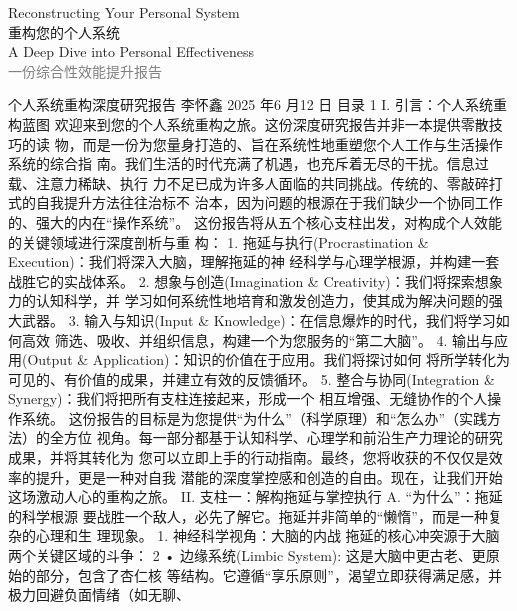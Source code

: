 \documentclass[a4paper,12pt]{article}
\title{\vspace{-2cm}}
\author{}
\date{}
\begin{document}
\begin{center}
    \fontsize{25pt}{30pt}\selectfont  Reconstructing Your Personal System\\
    \fontsize{20pt}{25pt}\selectfont  重构您的个人系统\textbar \\
    \fontsize{12pt}{15pt}\selectfont A Deep Dive into Personal Effectiveness\\
    \fontsize{12pt}{15pt}\selectfont\textcolor{gray}{一份综合性效能提升报告}
\end{center}

\begin{multicols}{2}
    \thispagestyle{firstpage}
    \onehalfspacing

    个人系统重构深度研究报告 李怀鑫 2025 年6 月12 日 目录 1 I.
    引言：个人系统重构蓝图
    欢迎来到您的个人系统重构之旅。这份深度研究报告并非一本提供零散技巧的读
    物，而是一份为您量身打造的、旨在系统性地重塑您个人工作与生活操作系统的综合指
    南。我们生活的时代充满了机遇，也充斥着无尽的干扰。信息过载、注意力稀缺、执行
    力不足已成为许多人面临的共同挑战。传统的、零敲碎打式的自我提升方法往往治标不
    治本，因为问题的根源在于我们缺少一个协同工作的、强大的内在``操作系统''。
    这份报告将从五个核心支柱出发，对构成个人效能的关键领域进行深度剖析与重
    构： 1. 拖延与执行(Procrastination \&
    Execution)：我们将深入大脑，理解拖延的神
    经科学与心理学根源，并构建一套战胜它的实战体系。 2.
    想象与创造(Imagination \&
    Creativity)：我们将探索想象力的认知科学，并
    学习如何系统性地培育和激发创造力，使其成为解决问题的强大武器。 3.
    输入与知识(Input \& Knowledge)：在信息爆炸的时代，我们将学习如何高效
    筛选、吸收、并组织信息，构建一个为您服务的``第二大脑''。 4.
    输出与应用(Output \&
    Application)：知识的价值在于应用。我们将探讨如何
    将所学转化为可见的、有价值的成果，并建立有效的反馈循环。 5.
    整合与协同(Integration \&
    Synergy)：我们将把所有支柱连接起来，形成一个
    相互增强、无缝协作的个人操作系统。
    这份报告的目标是为您提供``为什么''（科学原理）和``怎么办''（实践方法）的全方位
    视角。每一部分都基于认知科学、心理学和前沿生产力理论的研究成果，并将其转化为
    您可以立即上手的行动指南。最终，您将收获的不仅仅是效率的提升，更是一种对自我
    潜能的深度掌控感和创造的自由。现在，让我们开始这场激动人心的重构之旅。
    II. 支柱一：解构拖延与掌控执行 A. ``为什么''：拖延的科学根源
    要战胜一个敌人，必先了解它。拖延并非简单的``懒惰''，而是一种复杂的心理和生
    理现象。 1. 神经科学视角：大脑的内战
    拖延的核心冲突源于大脑两个关键区域的斗争： 2 • 边缘系统(Limbic
    System): 这是大脑中更古老、更原始的部分，包含了杏仁核
    等结构。它遵循``享乐原则''，渴望立即获得满足感，并极力回避负面情绪（如无聊、

\end{multicols}
\end{document}
